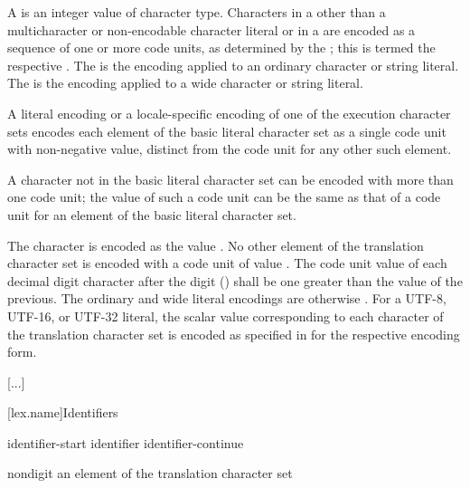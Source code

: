 \documentclass{wg21}
\newcommand{\replaceucs}{\changed{UCS}{Unicode}}
\begin{document}
\pnum
A  is an integer value
of character type.
Characters in a 
other than a multicharacter or non-encodable character literal or
in a  are encoded as
a sequence of one or more code units, as determined
by the ;
this is termed the respective .
The  is
the encoding applied to an ordinary character or string literal.
The  is the encoding applied
to a wide character or string literal.

\pnum
A literal encoding or a locale-specific encoding of one of
the execution character sets
encodes each element of the basic literal character set as
a single code unit with non-negative value,
distinct from the code unit for any other such element.
\begin{note}
    A character not in the basic literal character set
    can be encoded with more than one code unit;
    the value of such a code unit can be the same as
    that of a code unit for an element of the basic literal character set.
\end{note}
%
%
The  character is encoded as the value .
No other element of the translation character set
is encoded with a code unit of value .
The code unit value of each decimal digit character after the digit  ()
shall be one greater than the value of the previous.
The ordinary and wide literal encodings are otherwise
.
%
%
%
For a UTF-8, UTF-16, or UTF-32 literal,
the \replaceucs{} scalar value
corresponding to each character of the translation character set
is encoded as specified in  for the respective \replaceucs{} encoding form.

\textcolor{noteclr}{[...]}

[lex.name]{Identifiers}

%
\begin{bnf}
    \br
    identifier-start\br
    identifier identifier-continue
\end{bnf}

\begin{bnf}
    \br
    nondigit\br
    \textnormal{an element of the translation character set }
\end{bnf}
\end{document}
